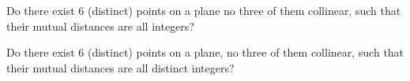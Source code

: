 Do there exist 6 (distinct) points on a plane
no three of them collinear,
such that their mutual distances are all integers?

Do there exist 6 (distinct) points on a plane,
no three of them collinear,
such that their mutual distances are all distinct integers?
